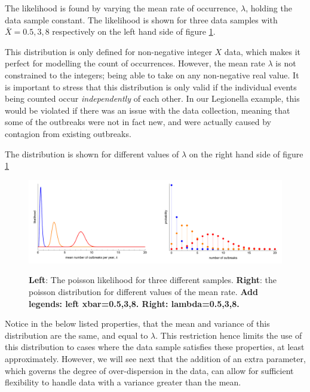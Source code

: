 \documentclass[11pt,fullpage]{book}
\begin{document}
The likelihood is found by varying the mean rate of occurrence, $\lambda$, holding the data sample constant. The likelihood is shown for three data samples with $\bar{X}=0.5,3,8$ respectively on the left hand side of figure \ref{fig:Distributions_poissonLegionella}. 

This distribution is only defined for non-negative integer $X$ data, which makes it perfect for modelling the count of occurrences. However, the mean rate $\lambda$ is not constrained to the integers; being able to take on any non-negative real value. It is important to stress that this distribution is only valid if the individual events being counted occur \textit{independently} of each other. In our Legionella example, this would be violated if there was an issue with the data collection, meaning that some of the outbreaks were not in fact new, and were actually caused by contagion from existing outbreaks. 

The distribution is shown for different values of $\lambda$ on the right hand side of figure \ref{fig:Distributions_poissonLegionella}

\begin{figure}
\centering
\scalebox{0.5} 
{\includegraphics{Distributions_poissonLegionella.pdf}}
\caption{\textbf{Left}: The poisson likelihood for three different samples. \textbf{Right}: the poisson distribution for different values of the mean rate. \textbf{Add legends: left xbar=0.5,3,8. Right: lambda=0.5,3,8.}}\label{fig:Distributions_poissonLegionella}
\end{figure}

Notice in the below listed properties, that the mean and variance of this distribution are the same, and equal to $\lambda$. This restriction hence limits the use of this distribution to cases where the data sample satisfies these properties, at least approximately. However, we will see next that the addition of an extra parameter, which governs the degree of over-dispersion in the data, can allow for sufficient flexibility to handle data with a variance greater than the mean.
\end{document}

